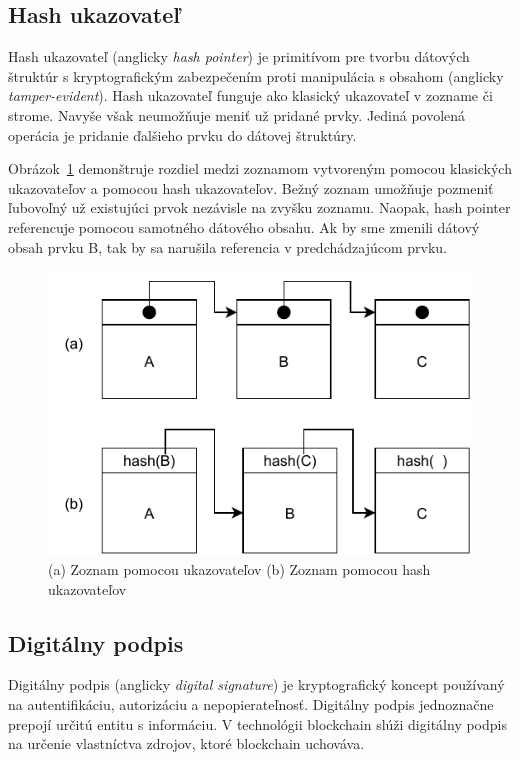 \subsection{Hash ukazovateľ}\label{subsec:hash-pointer}
Hash ukazovateľ (anglicky \textit{hash pointer}) je primitívom pre tvorbu dátových štruktúr s kryptografickým zabezpečením proti manipulácia s obsahom (anglicky \textit{tamper-evident}). Hash ukazovateľ funguje ako klasický ukazovateľ v zozname či strome. Navyše však neumožňuje meniť už pridané prvky. Jediná povolená operácia je pridanie ďalšieho prvku do dátovej štruktúry. 

Obrázok~\ref{img:hash-pointer} demonštruje rozdiel medzi zoznamom vytvoreným pomocou klasických ukazovateľov a pomocou hash ukazovateľov. Bežný zoznam umožňuje pozmeniť ľubovoľný už existujúci prvok nezávisle na zvyšku zoznamu. Naopak, hash pointer referencuje pomocou samotného dátového obsahu. Ak by sme zmenili dátový obsah prvku B, tak by sa narušila referencia v predchádzajúcom prvku.
~\cite{horizenAcademy, narayanan2016bitcoin}


\begin{figure}[bt]
	\centering
	\includegraphics[width=.6\textwidth]{obrazky-figures/hash-pointer}
	\caption{(a) Zoznam pomocou ukazovateľov \medspace (b) Zoznam pomocou hash ukazovateľov}
	\label{img:hash-pointer}
\end{figure}

\subsection{Digitálny podpis}\label{subsec:sign}
Digitálny podpis (anglicky \textit{digital signature}) je kryptografický koncept používaný na autentifikáciu, autorizáciu a nepopierateľnosť. Digitálny podpis jednoznačne prepojí určitú entitu s informáciu. V technológii blockchain slúži digitálny podpis na určenie vlastníctva zdrojov, ktoré blockchain uchováva.~\cite{cryptoHandbook, satoshiBitcoin}

